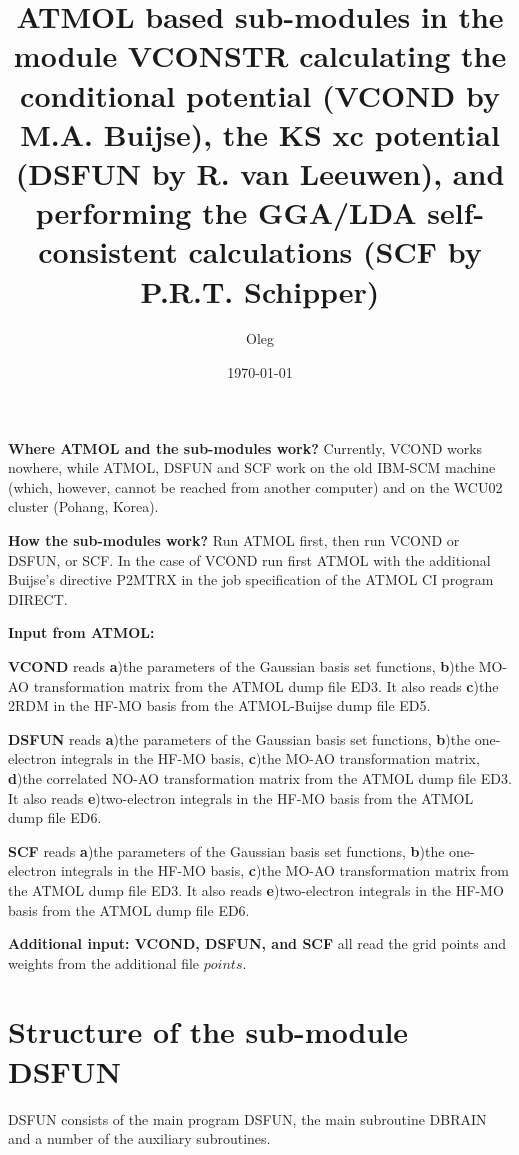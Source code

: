 \documentclass[onecolumn,preprintnumbers,amsmath,amssymb]{revtex4}
\begin{document}

\title{ATMOL based sub-modules in the module VCONSTR calculating the conditional potential (VCOND by M.A. Buijse), the KS xc potential (DSFUN by R. van Leeuwen), and performing the GGA/LDA self-consistent calculations (SCF by P.R.T. Schipper)}
\author{Oleg}

\date{\today}  

\maketitle

\textbf{Where ATMOL and the sub-modules work?} Currently, VCOND works nowhere, while ATMOL, DSFUN and SCF work on the old IBM-SCM machine (which, however, cannot be reached from another computer) and on the WCU02 cluster (Pohang, Korea). 

\textbf{How the sub-modules work?} Run ATMOL first, then run VCOND or DSFUN, or SCF. In the case of VCOND run first ATMOL with the additional Buijse's directive P2MTRX in the job specification of the ATMOL CI program DIRECT. 

\textbf{Input from ATMOL:} 

\textbf{VCOND} reads \textbf{a})the parameters of the Gaussian basis set functions, \textbf{b})the MO-AO transformation matrix from the ATMOL dump file ED3. It also reads \textbf{c})the 2RDM in the HF-MO basis from the ATMOL-Buijse dump file ED5.

\textbf{DSFUN} reads \textbf{a})the parameters of the Gaussian basis set functions, \textbf{b})the one-electron integrals in the HF-MO basis, \textbf{c})the MO-AO transformation matrix, \textbf{d})the correlated NO-AO transformation matrix from the ATMOL dump file ED3. It also reads \textbf{e})two-electron integrals in the HF-MO basis from the ATMOL dump file ED6. 

\textbf{SCF} reads \textbf{a})the parameters of the Gaussian basis set functions, \textbf{b})the one-electron integrals in the HF-MO basis, \textbf{c})the MO-AO transformation matrix from the ATMOL dump file ED3. It also reads \textbf{e})two-electron integrals in the HF-MO basis from the ATMOL dump file ED6.

\textbf{Additional input: VCOND, DSFUN, and SCF} all read the grid points and weights from the additional file $points$. 

\section{Structure of the sub-module DSFUN}
DSFUN consists of the main program DSFUN, the main subroutine DBRAIN and a number of the auxiliary subroutines.
\end{document}
